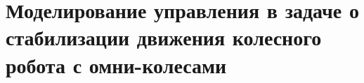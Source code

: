 \section{Моделирование управления в задаче о стабилизации движения колесного робота с омни-колесами} \label{p33}
